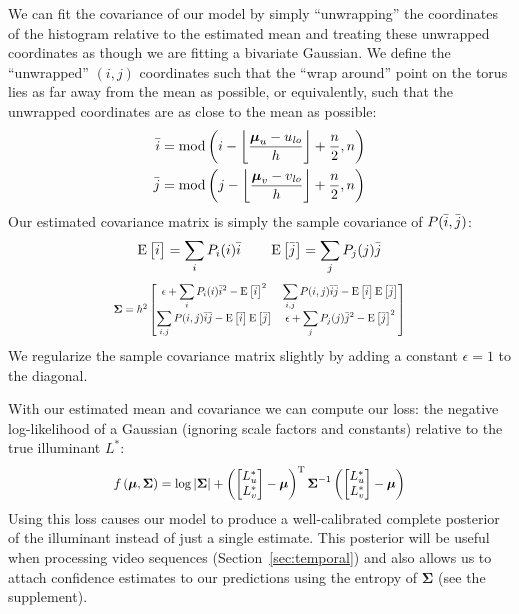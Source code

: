 \documentclass[10pt,twocolumn,letterpaper]{article}
\newcommand{\floor}[1]{\left \lfloor #1 \right \rfloor}
\newcommand{\E}[1]{\operatorname{E}\left\lbrack#1\right\rbrack}
\newcommand{\lossdata}[1]{f\left( #1 \right )}
\begin{document}
We can fit the covariance of our model
by simply ``unwrapping'' the coordinates of the histogram relative to the
estimated mean and treating these unwrapped coordinates
as though we are fitting a bivariate Gaussian.
We define the ``unwrapped'' $(i, j)$ coordinates such that the ``wrap around''
point on the torus lies as far away from the mean as possible,
or equivalently,
such that the unwrapped coordinates are as close to the mean as possible:
\begin{align}
\ishift & = \operatorname{mod}\left( i - \floor{\boldsymbol{\mu}_u - u_\mathit{lo} \over h} + {n \over 2}, n \right) \nonumber \\
\jshift & = \operatorname{mod}\left( j - \floor{\boldsymbol{\mu}_v - v_\mathit{lo} \over h} + {n \over 2}, n \right)
\end{align}
Our estimated covariance matrix is simply the sample covariance of $P(\bar{i}, \bar{j})$:
\begin{equation}
\displaystyle \E{\ishift} = \sum_i P_i(i) \ishift \quad \quad \displaystyle \E{\jshift} = \sum_j P_j(j) \jshift
\end{equation}
\begin{equation}
\resizebox{2.9in}{!}{$
\boldsymbol{\Sigma} = h^2
\begin{bmatrix}
\displaystyle \epsilon + \sum_i P_i(i) \ishift^2 - \E{\ishift}^2&
\displaystyle \sum_{i,j} P(i,j) \ishift \jshift - \E{\ishift} \E{\jshift} \\
\displaystyle \sum_{i,j} P(i,j) \ishift \jshift - \E{\ishift} \E{\jshift} &
\displaystyle \epsilon + \sum_j P_j(j) \jshift^2 - \E{\jshift}^2
\end{bmatrix}
$} \label{eq:covariance}
\end{equation}
We regularize the sample covariance matrix slightly by adding a constant $\epsilon=1$
to the diagonal.

With our estimated mean and covariance we can compute our loss: the negative log-likelihood
of a Gaussian (ignoring scale factors and constants) relative to the true illuminant $L^*$:
\begin{equation}
\resizebox{2.9in}{!}{$
\lossdata{\boldsymbol{\mu}, \boldsymbol{\Sigma}} = \log{| \boldsymbol{\Sigma} | } + \left( \begin{bmatrix}
L^*_u \\ L^*_v
\end{bmatrix} - \boldsymbol{\mu} \right)^\mathrm{T} \boldsymbol{\Sigma}^{-1} \left( \begin{bmatrix}
L^*_u \\ L^*_v
\end{bmatrix} - \boldsymbol{\mu} \right) \label{eq:lossdata}
$}
\end{equation}
Using this loss causes our model to produce a well-calibrated complete posterior
of the illuminant instead of just a single estimate.
This posterior will be useful when processing video sequences
(Section~\ref{sec:temporal})
and also allows us to attach confidence estimates to our predictions
using the entropy of $\boldsymbol{\Sigma}$ (see the supplement).
\end{document}
